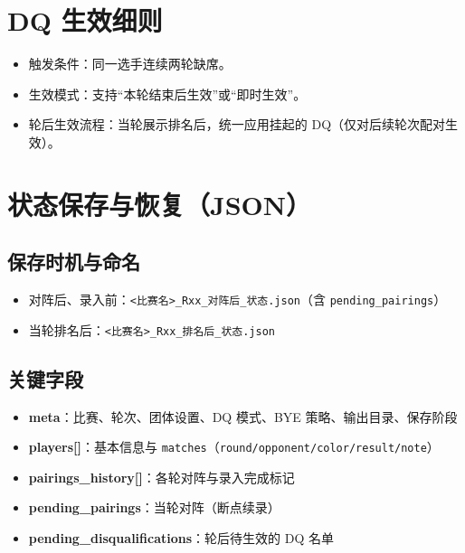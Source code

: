 \documentclass[12pt]{ctexart}
\begin{document}
\section{DQ 生效细则}
\begin{itemize}[leftmargin=1.6em]
  \item 触发条件：同一选手连续两轮缺席。
  \item 生效模式：支持“本轮结束后生效”或“即时生效”。
  \item 轮后生效流程：当轮展示排名后，统一应用挂起的 DQ（仅对后续轮次配对生效）。
\end{itemize}

\section{状态保存与恢复（JSON）}
\subsection*{保存时机与命名}
\begin{itemize}[leftmargin=1.6em]
  \item 对阵后、录入前：\verb|<比赛名>_Rxx_对阵后_状态.json|（含 \verb|pending_pairings|）
  \item 当轮排名后：\verb|<比赛名>_Rxx_排名后_状态.json|
\end{itemize}

\subsection*{关键字段}
\begin{itemize}[leftmargin=1.6em]
  \item \textbf{meta}：比赛、轮次、团体设置、DQ 模式、BYE 策略、输出目录、保存阶段
  \item \textbf{players[]}：基本信息与 \verb|matches|（\verb|round/opponent/color/result/note|）
  \item \textbf{pairings\_history[]}：各轮对阵与录入完成标记
  \item \textbf{pending\_pairings}：当轮对阵（断点续录）
  \item \textbf{pending\_disqualifications}：轮后待生效的 DQ 名单
\end{itemize}
\end{document}

